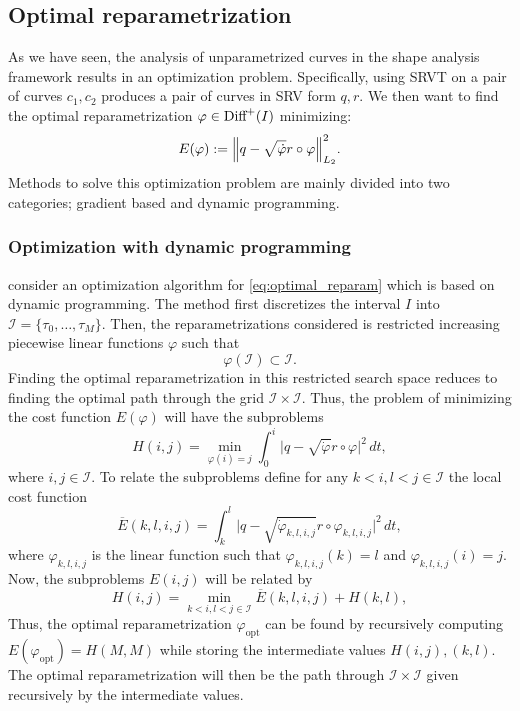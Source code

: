 
\subsection{Optimal reparametrization}
As we have seen, the analysis of unparametrized curves in the shape analysis framework results in an optimization problem. Specifically, using SRVT on a pair of curves \(c_1, c_2\) produces a pair of curves in SRV form \(q, r\). We then want to find the optimal reparametrization \(\varphi \in \text{Diff}^+(I)\) minimizing:
\begin{equation}\label{eq:optimal_reparam}
  E(\varphi):=\norm{q- \sqrt{\dot\varphi}r \circ \varphi}_{L_2}^2.
\end{equation}
Methods to solve this optimization problem are mainly divided into two categories; gradient based and dynamic programming.

\subsubsection{Optimization with dynamic programming}
\citeauthor{bauer2017dp} \cite{bauer2017dp} consider an optimization algorithm for \eqref{eq:optimal_reparam} which is based on dynamic programming. The method first discretizes the interval \(I\) into  \(\mathcal{I} = \{\tau_0, \ldots, \tau_M\}\). Then, the reparametrizations considered is restricted increasing piecewise linear functions \(\varphi\) such that
\begin{equation*}
  \varphi(\mathcal{I}) \subset \mathcal{I}.
\end{equation*}
Finding the optimal reparametrization in this restricted search space reduces to finding the optimal path through the grid \(\mathcal{I}\times\mathcal{I}\). Thus, the problem of minimizing the cost function \(E(\varphi)\) will have the subproblems
\begin{equation*}
  H(i, j) = \min_{\varphi(i) = j} \int_0^i \vert q- \sqrt{\dot\varphi }r \circ \varphi \vert^2 \, dt,
\end{equation*}
where \(i,j \in \mathcal{I}\). To relate the subproblems define for any \(k <i, l<j \in \mathcal{I} \) the local cost function
\begin{equation*}
  \overline E(k,l,i,j) =   \int_k^l \vert q- \sqrt{\dot\varphi_{k,l,i,j} }r \circ \varphi_{k,l,i,j} \vert^2 \, dt ,
\end{equation*}
where \(\varphi_{k,l,i,j} \) is the linear function such that \(\varphi_{k,l,i,j}(k)=l\) and \(\varphi_{k,l,i,j}(i)=j\). Now, the subproblems \(E(i,j)\) will be related by
\begin{equation*}
  H(i,j)  = \min_{k<i,l<j\in \mathcal{I}}\overline{E}(k,l,i,j) + H(k,l),
\end{equation*}
Thus, the optimal reparametrization \(\varphi_\text{opt}\) can be found by recursively computing \(E(\varphi_\text{opt})= H(M,M)\) while storing the intermediate values \(H(i,j), (k,l)\). The optimal reparametrization will then be the path through \(\mathcal{I}\times\mathcal{I}\) given recursively by the intermediate values. 

